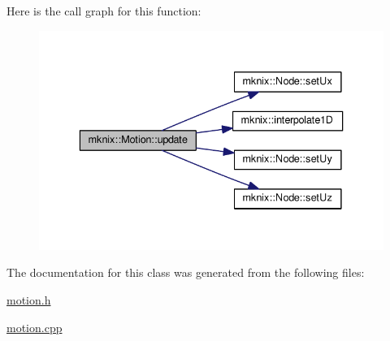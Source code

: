Here is the call graph for this function\+:\nopagebreak
\begin{figure}[H]
\begin{center}
\leavevmode
\includegraphics[width=336pt]{d1/dda/classmknix_1_1_motion_a394f15ff3316a804176f0761abf66513_cgraph}
\end{center}
\end{figure}




The documentation for this class was generated from the following files\+:\begin{DoxyCompactItemize}
\item 
\hyperlink{motion_8h}{motion.\+h}\item 
\hyperlink{motion_8cpp}{motion.\+cpp}\end{DoxyCompactItemize}
